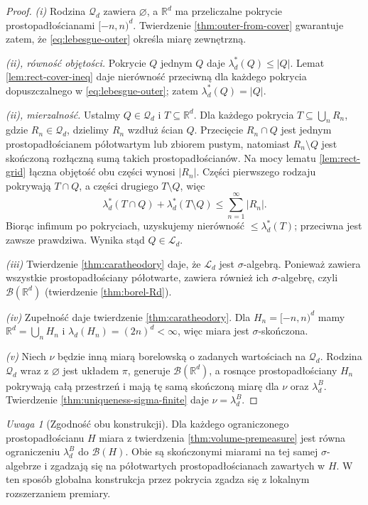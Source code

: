 \documentclass[11pt,a4paper,oneside]{book}
\numberwithin{equation}{chapter}
\theoremstyle{plain}
\theoremstyle{definition}
\theoremstyle{remark}
\newtheorem{uwaga}[twierdzenie]{Uwaga}
\begin{document}
\begin{proof}
\emph{(i)} Rodzina $\mathcal Q_d$ zawiera $\varnothing$,
a $\mathbb R^d$ ma przeliczalne pokrycie prostopadłościanami
$[-n,n)^d$. Twierdzenie \ref{thm:outer-from-cover}
gwarantuje zatem, że \eqref{eq:lebesgue-outer}
określa miarę zewnętrzną.

\emph{(ii), równość objętości.}
Pokrycie $Q$ jednym $Q$ daje $\lambda_d^*(Q)\le|Q|$.
Lemat \ref{lem:rect-cover-ineq} daje nierówność
przeciwną dla każdego pokrycia dopuszczalnego w
\eqref{eq:lebesgue-outer}; zatem $\lambda_d^*(Q)=|Q|$.

\emph{(ii), mierzalność.}
Ustalmy $Q\in\mathcal Q_d$ i $T\subseteq\mathbb R^d$.
Dla każdego pokrycia $T\subseteq\bigcup_nR_n$, gdzie
$R_n\in\mathcal Q_d$, dzielimy $R_n$ wzdłuż ścian $Q$.
Przecięcie $R_n\cap Q$ jest jednym prostopadłościanem
półotwartym lub zbiorem pustym, natomiast
$R_n\setminus Q$ jest skończoną rozłączną sumą
takich prostopadłościanów. Na mocy lematu
\ref{lem:rect-grid} łączna objętość obu części wynosi
$|R_n|$. Części pierwszego rodzaju pokrywają
$T\cap Q$, a części drugiego $T\setminus Q$, więc
\[
\lambda_d^*(T\cap Q)+\lambda_d^*(T\setminus Q)
\le\sum_{n=1}^\infty |R_n|.
\]
Biorąc infimum po pokryciach, uzyskujemy nierówność
$\le\lambda_d^*(T)$; przeciwna jest zawsze prawdziwa.
Wynika stąd $Q\in\mathcal L_d$.

\emph{(iii)} Twierdzenie \ref{thm:caratheodory} daje,
że $\mathcal L_d$ jest $\sigma$-algebrą. Ponieważ zawiera
wszystkie prostopadłościany półotwarte, zawiera również
ich $\sigma$-algebrę, czyli $\mathcal B(\mathbb R^d)$
(twierdzenie \ref{thm:borel-Rd}).

\emph{(iv)} Zupełność daje twierdzenie
\ref{thm:caratheodory}. Dla $H_n=[-n,n)^d$ mamy
$\mathbb R^d=\bigcup_nH_n$ i
$\lambda_d(H_n)=(2n)^d<\infty$, więc miara jest
$\sigma$-skończona.

\emph{(v)} Niech $\nu$ będzie inną miarą borelowską
o zadanych wartościach na $\mathcal Q_d$.
Rodzina $\mathcal Q_d$ wraz z $\varnothing$ jest
układem $\pi$, generuje $\mathcal B(\mathbb R^d)$,
a rosnące prostopadłościany $H_n$ pokrywają całą
przestrzeń i mają tę samą skończoną miarę dla
$\nu$ oraz $\lambda_d^B$. Twierdzenie
\ref{thm:uniqueness-sigma-finite} daje
$\nu=\lambda_d^B$.
\end{proof}

\begin{uwaga}[Zgodność obu konstrukcji]
Dla każdego ograniczonego prostopadłościanu $H$
miara z twierdzenia \ref{thm:volume-premeasure} jest
równa ograniczeniu $\lambda_d^B$ do
$\mathcal B(H)$. Obie są skończonymi miarami na
tej samej $\sigma$-algebrze i zgadzają się na
półotwartych prostopadłościanach zawartych w $H$.
W ten sposób globalna konstrukcja przez pokrycia
zgadza się z lokalnym rozszerzaniem premiary.
\end{uwaga}
\end{document}
